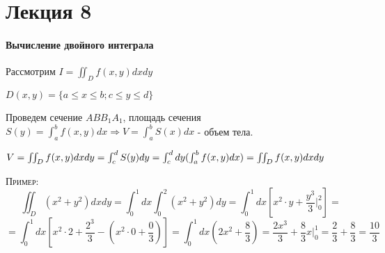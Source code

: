 \chapter{Лекция 8}
\subsubsection{Вычисление двойного интеграла}

Рассмотрим $I = \iint_D f(x,y)dxdy $

$D(x,y) = \{a \leq x \leq b; c \leq y \leq d \}$

Проведем сечение $ABB_1A_1$, площадь сечения $S(y) = \int_a^b f(x,y)dx \Rightarrow V = \int_a^b S(x)dx$ - объем тела.

$V = \iint_D f(x,y) dxdy = \int^d_c S(y)dy = \int^d_c dy ( \int^b_a f(x,y)dx ) = \iint_D f(x,y)dxdy \\$



\textsc{Пример:} $$\iint_D (x^2 + y^2) dxdy = \int_0^1 dx \int_0^2 (x^2 + y^2) dy = \int^1_0 dx [x^2 \cdot y + \frac{y^3}{3} |^2_0]=$$
$$=\int^1_0 dx [x^2 \cdot 2 + \frac{2^3}{3} - (x^2 \cdot 0 + \frac{0}{3})] = \int^1_0 dx (2x^2 + \frac{8}{3}) = \frac{2x^3}{3} + \frac{8}{3}x |^1_0 = \frac{2}{3} + \frac{8}{3} = \frac{10}{3}$$